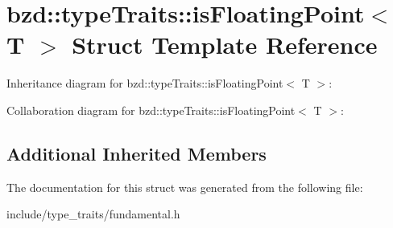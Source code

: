 \hypertarget{structbzd_1_1typeTraits_1_1isFloatingPoint}{}\section{bzd\+:\+:type\+Traits\+:\+:is\+Floating\+Point$<$ T $>$ Struct Template Reference}
\label{structbzd_1_1typeTraits_1_1isFloatingPoint}


Inheritance diagram for bzd\+:\+:type\+Traits\+:\+:is\+Floating\+Point$<$ T $>$\+:


Collaboration diagram for bzd\+:\+:type\+Traits\+:\+:is\+Floating\+Point$<$ T $>$\+:
\subsection*{Additional Inherited Members}


The documentation for this struct was generated from the following file\+:\begin{DoxyCompactItemize}
\item 
include/type\+\_\+traits/fundamental.\+h\end{DoxyCompactItemize}
